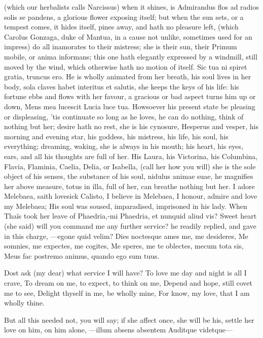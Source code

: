 (which our herbalists calls Narcissus) when it shines, is Admirandus
flos ad radios solis se pandens, a glorious flower exposing itself;
but when the sun sets, or a tempest comes, it hides itself, pines
away, and hath no pleasure left, (which Carolus Gonzaga, duke of
Mantua, in a cause not unlike, sometimes used for an impress) do all
inamorates to their mistress; she is their sun, their Primum mobile, or
anima informans; this one hath elegantly expressed by a windmill,
still moved by the wind, which otherwise hath no motion of itself. Sic
tua ni spiret gratia, truncus ero. He is wholly animated from her
breath, his soul lives in her body, sola claves habet interitus
et salutis, she keeps the keys of his life: his fortune ebbs and flows
with her favour, a gracious or bad aspect turns him up or down, Mens
mea lucescit Lucia luce tua. Howsoever his present state be pleasing or
displeasing, 'tis continuate so long as he loves, he can do
nothing, think of nothing but her; desire hath no rest, she is his
cynosure, Hesperus and vesper, his morning and evening star, his
goddess, his mistress, his life, his soul, his everything; dreaming,
waking, she is always in his mouth; his heart, his eyes, ears, and all
his thoughts are full of her. His Laura, his Victorina, his Columbina,
Flavia, Flaminia, Caelia, Delia, or Isabella, (call her how you will)
she is the sole object of his senses, the substance of his soul,
nidulus animae suae, he magnifies her above measure, totus in illa,
full of her, can breathe nothing but her. I adore Melebaea, saith
lovesick Calisto, I believe in Melebaea, I honour, admire and
love my Melebaea; His soul was soused, imparadised, imprisoned in his
lady. When Thaïs took her leave of Phaedria,-mi Phaedria, et
nunquid aliud vis? Sweet heart (she said) will you command me any
further service? he readily replied, and gave in this charge,
---egone quid velim?
Dies noctesque ames me, me desideres,
Me somnies, me expectes, me cogites,
Me speres, me te oblectes, mecum tota sis,
Meus fac postremo animus, quando ego sum tuus.

Dost ask (my dear) what service I will have?
To love me day and night is all I crave,
To dream on me, to expect, to think on me,
Depend and hope, still covet me to see,
Delight thyself in me, be wholly mine,
For know, my love, that I am wholly thine.

But all this needed not, you will say; if she affect once, she will be
his, settle her love on him, on him alone,
---illum absens absentem
Auditque videtque---

